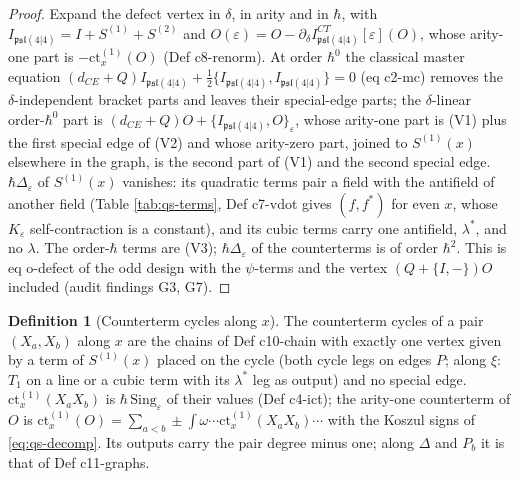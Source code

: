 \documentclass[11pt]{article}
\numberwithin{equation}{section}
\theoremstyle{plain}
\theoremstyle{definition}
\newtheorem{definition}[theorem]{Definition}
\begin{document}
\begin{proof}
Expand the defect vertex in $\delta$, in arity and in $\hbar$, with $I_{\mathfrak{psl}(4|4)}=I+S^{(1)}+S^{(2)}$ and $O(\varepsilon)=O-\partial_\delta I^{CT}_{\mathfrak{psl}(4|4)}[\varepsilon](O)$, whose arity-one part is $-\mathrm{ct}^{(1)}_x(O)$ (Def c8-renorm). At order $\hbar^0$ the classical master equation $(d_{CE}+Q)I_{\mathfrak{psl}(4|4)}+\tfrac12\{I_{\mathfrak{psl}(4|4)},I_{\mathfrak{psl}(4|4)}\}=0$ (eq c2-mc) removes the $\delta$-independent bracket parts and leaves their special-edge parts; the $\delta$-linear order-$\hbar^0$ part is $(d_{CE}+Q)O+\{I_{\mathfrak{psl}(4|4)},O\}_\varepsilon$, whose arity-one part is (V1) plus the first special edge of (V2) and whose arity-zero part, joined to $S^{(1)}(x)$ elsewhere in the graph, is the second part of (V1) and the second special edge. $\hbar\Delta_\varepsilon$ of $S^{(1)}(x)$ vanishes: its quadratic terms pair a field with the antifield of another field (Table \ref{tab:qs-terms}, Def c7-vdot gives $(f,f^*)$ for even $x$, whose $K_\varepsilon$ self-contraction is a constant), and its cubic terms carry one antifield, $\lambda^*$, and no $\lambda$. The order-$\hbar$ terms are (V3); $\hbar\Delta_\varepsilon$ of the counterterms is of order $\hbar^2$. This is eq o-defect of the odd design with the $\psi$-terms and the vertex $(Q+\{I,-\})O$ included (audit findings G3, G7).
\end{proof}

\begin{definition}[Counterterm cycles along $x$]
\label{def:qs-ct1}
The counterterm cycles of a pair $(X_a,X_b)$ along $x$ are the chains of Def c10-chain with exactly one vertex given by a term of $S^{(1)}(x)$ placed on the cycle (both cycle legs on edges $P$; along $\xi$: $T_1$ on a line or a cubic term with its $\lambda^*$ leg as output) and no special edge. $\mathrm{ct}^{(1)}_x(X_aX_b)$ is $\hbar\,\mathrm{Sing}_\varepsilon$ of their values (Def c4-ict); the arity-one counterterm of $O$ is $\mathrm{ct}^{(1)}_x(O)=\sum_{a<b}\pm\int\omega\cdots\mathrm{ct}^{(1)}_x(X_aX_b)\cdots$ with the Koszul signs of \eqref{eq:qs-decomp}. Its outputs carry the pair degree minus one; along $\Delta$ and $P_b$ it is that of Def c11-graphs.
\end{definition}
\end{document}
